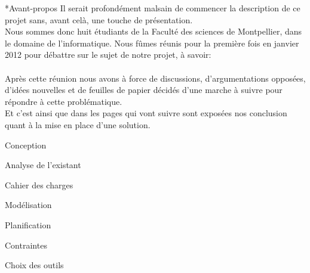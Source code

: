 \documentclass[a4paper, 12pt]{report}
\begin{document}
\begin{chapter}*{Avant-propos}
	Il serait profondément malsain de commencer la description de ce projet sans, avant celà, une touche de présentation.\\
	Nous sommes donc huit étudiants de la Faculté des sciences de Montpellier, dans le domaine de l'informatique.
	Nous fûmes réunis pour la première fois en janvier 2012 pour débattre sur le sujet de notre projet, à savoir:\\ 
	\\


    Après cette réunion nous avons à force de discussions, d'argumentations opposées, d'idées nouvelles et de feuilles de papier décidés d'une 
    marche à suivre pour répondre à cette problématique.\\
    Et c'est ainsi que dans les pages qui vont suivre sont exposées nos conclusion quant à la mise en place d'une solution.	
\end{chapter}

	\begin{part}{Conception}
		\begin{chapter}{Analyse de l'existant}
		\end{chapter}
		\begin{chapter}{Cahier des charges}
		\end{chapter}
		\begin{chapter}{Modélisation}
		\end{chapter}
	\end{part}
	\begin{part}{Planification}
		\begin{chapter}{Contraintes}
		\end{chapter}
		\begin{chapter}{Choix des outils}
		\end{chapter}
	\end{part}
\end{document}
